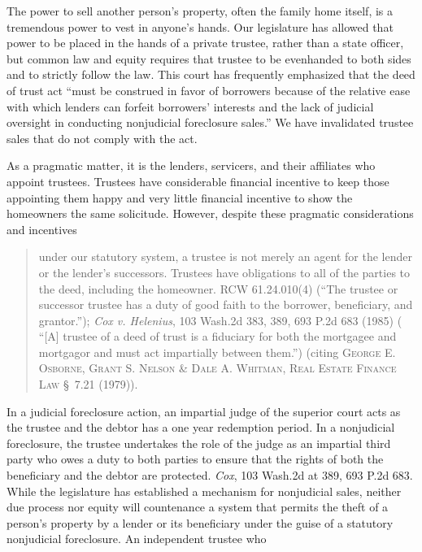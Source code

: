 The power to sell another person's property, often the family home
itself, is a tremendous power to vest in anyone's hands. Our legislature has
allowed that power to be placed in the hands of a private trustee, rather than
a state officer, but common law and equity requires that trustee to be
evenhanded to both sides and to strictly follow the law. This court has
frequently emphasized that the deed of trust act ``must be construed in favor
of borrowers because of the relative ease with which lenders can forfeit
borrowers' interests and the lack of judicial oversight in conducting
nonjudicial foreclosure sales.'' We have invalidated trustee sales that do not
comply with the act.

As a pragmatic matter, it is the lenders, servicers, and their
affiliates who appoint trustees. Trustees have considerable financial incentive
to keep those appointing them happy and very little financial incentive to show
the homeowners the same solicitude. However, despite these pragmatic
considerations and incentives
\begin{quote}
under our statutory system, a trustee is not merely an agent for the lender or
the lender's successors. Trustees have obligations to all of the parties to the
deed, including the homeowner. RCW 61.24.010(4) (``The trustee or successor
trustee has a duty of good faith to the borrower, beneficiary, and grantor.'');
\emph{Cox v. Helenius}, 103 Wash.2d 383, 389, 693 P.2d 683 (1985) ( ``[A]
trustee of a deed of trust is a fiduciary for both the mortgagee and mortgagor
and must act impartially between them.'') (citing \textsc{George E. Osborne, Grant S.
Nelson \& Dale A. Whitman, Real Estate Finance Law} \S~7.21 (1979)).
\end{quote}
In a judicial foreclosure action, an impartial judge of the superior court acts
as the trustee and the debtor has a one year redemption period. In a
nonjudicial foreclosure, the trustee undertakes the role of the judge as an
impartial third party who owes a duty to both parties to ensure that the rights
of both the beneficiary and the debtor are protected. \emph{Cox}, 103 Wash.2d at
389, 693 P.2d 683. While the legislature has established a mechanism for
nonjudicial sales, neither due process nor equity will countenance a system that
permits the theft of a person's property by a lender or its beneficiary under
the guise of a statutory nonjudicial foreclosure.  An independent trustee who
